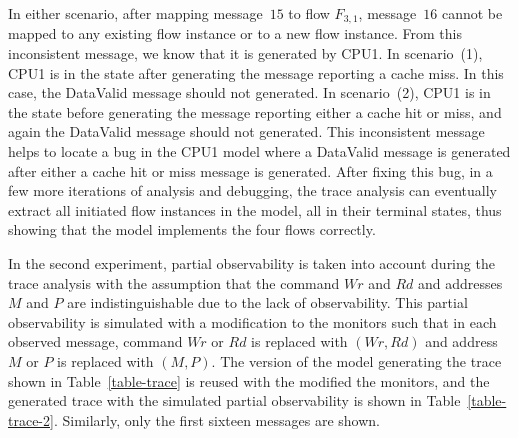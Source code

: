 \documentclass[conference]{IEEEtran}
\begin{document}
In either scenario, after mapping message~$15$ to flow $F_{3,1}$, message~$16$ cannot be mapped to any existing flow instance or to a new flow instance.  From this inconsistent message, we know that it is generated by CPU1.  In scenario~(1), CPU1 is in the state after generating the message reporting a cache miss.  In this case, the DataValid message should not generated.  In scenario~(2), CPU1 is in the state before generating the message reporting either a cache hit or miss, and again the DataValid message should not generated.   This inconsistent message helps to locate a bug in the CPU1 model where a DataValid message is generated after either a cache hit or miss message is generated.  After fixing this bug,  in a few more iterations of analysis and debugging, the trace analysis can eventually extract all initiated flow instances in the model, all in their terminal states, thus showing that the model implements the four flows correctly.


In the second experiment, partial observability is taken into account during the trace analysis with the assumption that the command $\mathit{Wr}$ and $\mathit{Rd}$ and addresses $M$ and $P$ are indistinguishable due to the lack of observability.  This partial observability is simulated with a modification to the monitors such that in each observed message, command $\mathit{Wr}$ or $\mathit{Rd}$ is replaced with $(\mathit{Wr},\mathit{Rd})$ and address $M$ or $P$ is replaced with $(M,P)$.  The version of the model generating the trace shown in Table~\ref{table-trace} is reused with the modified the monitors, and the generated trace with the simulated partial observability is shown in Table~\ref{table-trace-2}.  Similarly, only the first sixteen messages are shown. 
\begin{table}
\caption{A trace of messages with partial observability for trace analysis.}
\label{table-trace-2}
\begin{center}
\end{center}
\end{table}
\end{document}
